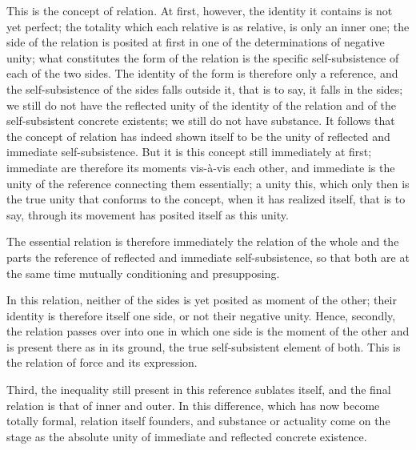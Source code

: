 This is the concept of relation.
At first, however, the identity it contains
is not yet perfect;
the totality which each relative is as relative,
is only an inner one;
the side of the relation is posited at first
in one of the determinations of negative unity;
what constitutes the form of the relation is
the specific self-subsistence of each of the two sides.
The identity of the form is therefore only a reference,
and the self-subsistence of the sides falls outside it,
that is to say, it falls in the sides;
we still do not have the reflected unity
of the identity of the relation
and of the self-subsistent concrete existents;
we still do not have substance.
It follows that the concept of relation has
indeed shown itself to be the unity
of reflected and immediate self-subsistence.
But it is this concept still immediately at first;
immediate are therefore its moments vis-à-vis each other,
and immediate is the unity of the reference
connecting them essentially;
a unity this, which only then is the true unity
that conforms to the concept,
when it has realized itself, that is to say,
through its movement has posited itself as this unity.

The essential relation is therefore immediately
the relation of the whole and the parts
the reference of reflected and immediate self-subsistence,
so that both are at the same time
mutually conditioning and presupposing.

In this relation, neither of the sides is
yet posited as moment of the other;
their identity is therefore itself one side,
or not their negative unity.
Hence, secondly, the relation passes over into one
in which one side is the moment of the other
and is present there as in its ground,
the true self-subsistent element of both.
This is the relation of force and its expression.

Third, the inequality still present
in this reference sublates itself,
and the final relation is that of inner and outer.
In this difference, which has now become totally formal,
relation itself founders,
and substance or actuality come on the stage as
the absolute unity of immediate and reflected concrete existence.
